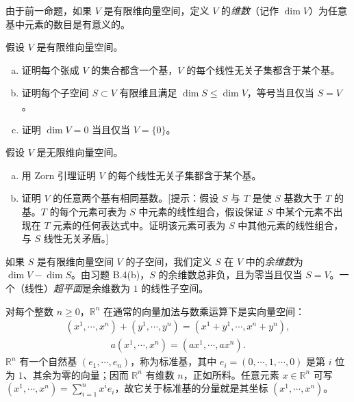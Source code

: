 \documentclass[../../main.tex]{subfiles}
\begin{document}
由于前一命题，如果 $V$ 是有限维向量空间，定义 $V$ 的\emph{维数}（记作 $\dim V$）为任意基中元素的数目是有意义的。

\begin{exercise}\label{exercise:appB-B-4}
假设 $V$ 是有限维向量空间。
\begin{enumerate}[(a)]
\item 证明每个张成 $V$ 的集合都含一个基，$V$ 的每个线性无关子集都含于某个基。
\item 证明每个子空间 $S\subset V$ 有限维且满足 $\dim S\leqslant\dim V$，等号当且仅当 $S=V$。
\item 证明 $\dim V=0$ 当且仅当 $V=\{0\}$。
\end{enumerate}
\end{exercise}

\begin{exercise}\label{exercise:appB-B-5}
假设 $V$ 是无限维向量空间。
\begin{enumerate}[(a)]
\item 用 Zorn 引理证明 $V$ 的每个线性无关子集都含于某个基。
\item 证明 $V$ 的任意两个基有相同基数。[提示：假设 $S$ 与 $T$ 是使 $S$ 基数大于 $T$ 的基。$T$ 的每个元素可表为 $S$ 中元素的线性组合，假设保证 $S$ 中某个元素不出现在 $T$ 元素的任何表达式中。证明该元素可表为 $S$ 中其他元素的线性组合，与 $S$ 线性无关矛盾。]
\end{enumerate}
\end{exercise}

如果 $S$ 是有限维向量空间 $V$ 的子空间，我们定义 $S$ 在 $V$ 中的\emph{余维数}为 $\dim V-\dim S$。由习题 B.4(b)，$S$ 的余维数总非负，且为零当且仅当 $S=V$。一个（线性）\emph{超平面}是余维数为 $1$ 的线性子空间。

\begin{example}[Euclid 空间]\label{example:appB-euclidean-spaces}
对每个整数 $n\geqslant0$，$\mathbb R^n$ 在通常的向量加法与数乘运算下是实向量空间：
\begin{align*}
(x^1,\cdots ,x^n)+(y^1,\cdots ,y^n)=(x^1+y^1,\cdots ,x^n+y^n),
\end{align*}
\begin{align*}
a(x^1,\cdots ,x^n)=(ax^1,\cdots ,ax^n).
\end{align*}
$\mathbb R^n$ 有一个自然基 $(e_1,\cdots ,e_n)$，称为标准基，其中 $e_i=(0,\cdots ,1,\cdots ,0)$ 是第 $i$ 位为 $1$、其余为零的向量；因而 $\mathbb R^n$ 有维数 $n$，正如所料。任意元素 $x\in\mathbb R^n$ 可写 $(x^1,\cdots ,x^n)=\sum_{i=1}^n x^i e_i$，故它关于标准基的分量就是其坐标 $(x^1,\cdots ,x^n)$。
\end{example}
\end{document}
